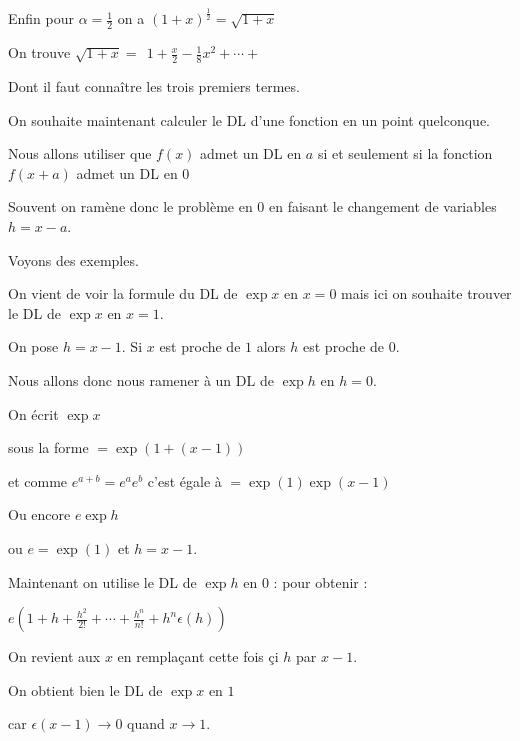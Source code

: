 \change

Enfin pour $\alpha = \frac12$ on a $(1+x)^{\frac12} = \sqrt{1+x}$

On trouve 
$\sqrt{1+x}  =\ \ 1 + \frac{x}{2} - \frac{1}{8}x^2+ \cdots +$

Dont il faut connaître les trois premiers termes.


\diapo

On souhaite maintenant calculer le DL d'une fonction en un point quelconque.

\change

Nous allons utiliser que 
$f(x)$ admet un DL en $a$ si et seulement si la 
fonction $f(x+a)$ admet un DL en $0$

Souvent on ramène donc le problème en $0$ en faisant le changement de variables $h=x-a$. 

\change

Voyons des exemples.

On vient de voir la formule du DL de $\exp x$ en $x=0$ mais ici on 
souhaite trouver le DL de $\exp x$ en $x=1$.

\change

On pose $h=x-1$. Si $x$ est proche de $1$ alors $h$ est proche de $0$.

Nous allons donc nous ramener à un DL de $\exp h$ en $h=0$. 

\change 

On écrit $\exp x$ 

\change 

sous la forme 
$= \exp( 1+ (x-1) )$

\change

et comme $e^{a+b}=e^a e^b$ c'est égale à 
$ = \exp(1) \exp (x-1)$

\change

Ou encore $e \exp h$

ou $e=\exp(1)$ et $h=x-1$.


\change

Maintenant on utilise le DL de $\exp h$ en $0$ :
pour obtenir :

$e \left(1+h+ \frac{h^2}{2!} + \cdots + \frac{h^n}{n!}+h^n\epsilon(h)\right)$

\change

On revient aux $x$ en remplaçant cette fois çi $h$ par $x-1$.

On obtient bien le DL de $\exp x$ en $1$

\change

car 
$\epsilon(x-1) \to 0 $ quand $x\to1$.



